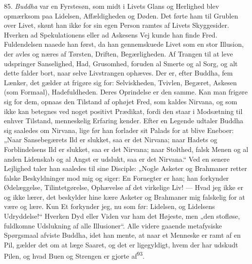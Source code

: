 \documentclass[12pt,a4paper,openany]{book}
\newcommand{\opage}[1]{\marginnote{\footnotesize\textit{[#1]}}}
\begin{document}
85. \textit{Buddha} var en Fyrstesøn, som midt i Livets Glans og
Herlighed blev opmærksom paa Lidelsen, Affældigheden og Døden. Det førte
ham til Grublen over Livet, skønt han ikke for sin egen Person ramtes af
Livets Skyggesider. Hverken ad Spekulationens eller ad Askesens Vej
kunde han finde Fred. Fuldendelsen naaede han først, da han gennemskuede
Livet som en stor Illusion, der avles og næres af Tørsten, Driften,
Begærligheden. Af Trangen til at leve udspringer Sanselighed, Had,
Grusomhed, foruden al Smerte og al Sorg, og alt dette falder bort, naar
selve Livstrangen ophæves. Der er, efter Buddha, fem Lænker, det gælder
at frigøre sig for: Selviskheden, Tvivlen, Begæret, Askesen (som
Formaal), Hadefuldheden. Deres Oprindelse er den samme. Kan man frigøre
sig for dem, opnaas den Tilstand af ophøjet Fred, som kaldes Nirvana, og
som ikke kan betegnes ved noget positivt Prædikat, fordi den staar i
Modsætning til enhver Tilstand, menneskelig Erfaring kender. Efter en
Legende udtaler Buddha sig saaledes om Nirvana, lige før han forlader
sit Palads for at blive Eneboer: „Naar Sansebegærets Ild er slukket, saa
er det Nirvana; naar Hadets og Forblindelsens Ild
\opage{195}er slukket, saa er det Nirvana; naar Stolthed, falsk Menen og
al anden Lidenskab og al Angst er udslukt, saa er det Nirvana.“ Ved en
senere Lejlighed taler han saaledes til sine Disciple: „Nogle Asketer og
Brahmaner retter falske Beskyldninger mod mig og siger: En Fornegter er
han; han forkynder Ødelæggelse, Tilintetgørelse, Ophævelse af det
virkelige Liv! --- Hvad jeg ikke er og ikke lærer, det beskylder hine
kære Asketer og Brahmaner mig falskelig for at være og lære. Kun Et
forkynder jeg, nu som før: Lidelsen, og Lidelsens Udryddelse!“ Hverken
Dyd eller Viden var ham det Højeste, men „den stofløse, fuldkomne
Udslukning af alle Illusioner“. Alle videre gaaende metafysiske
Spørgsmaal afviste Buddha, idet han mente, at naar et Menneske er ramt
af en Pil, gælder det om at læge Saaret, og det er ligegyldigt, hvem der
har udskudt Pilen, og hvad Buen og Strengen er gjorte
af\textsuperscript{93}.
\end{document}
